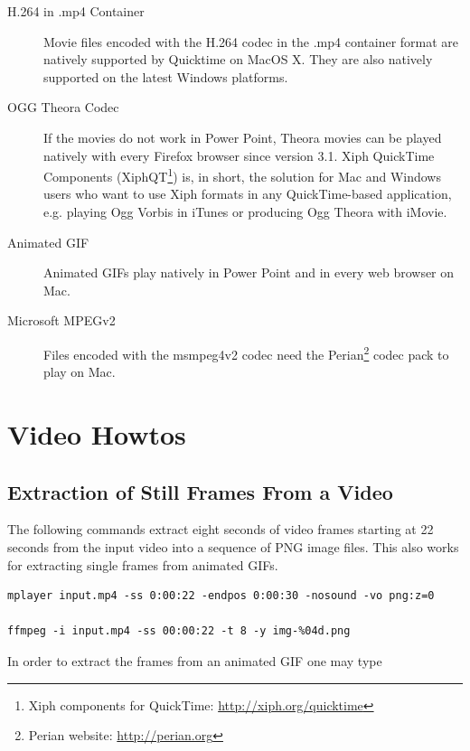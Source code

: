 \begin{description}
\item[H.264 in .mp4 Container] Movie files encoded with the H.264 codec in the
.mp4 container format are natively supported by Quicktime on MacOS X. They are
also natively supported on the latest Windows platforms.

\item[OGG  Theora Codec]  If the  movies do  not work  in Power  Point, Theora
movies  can  be played  natively  with  every  Firefox browser  since  version
3.1. Xiph QuickTime Components (XiphQT\footnote{Xiph components for QuickTime:
\url{http://xiph.org/quicktime}})  is,  in short,  the  solution  for Mac  and
Windows users who want to use Xiph formats in any QuickTime-based application,
e.g.  playing Ogg Vorbis in iTunes or producing Ogg Theora with iMovie.

\item[Animated GIF]  Animated GIFs play natively  in Power Point  and in every
web browser on Mac.

\item[Microsoft  MPEGv2]  Files encoded  with  the  msmpeg4v2  codec need  the
Perian\footnote{Perian website: \url{http://perian.org}} codec pack to play on
Mac.

\end{description}

\section{Video Howtos}

\subsection{Extraction of Still Frames From a Video}

The following  commands extract eight seconds  of video frames  starting at 22
seconds from  the input video into a  sequence of PNG image  files.  This also
works for extracting single frames from animated GIFs.

\begin{verbatim}
mplayer input.mp4 -ss 0:00:22 -endpos 0:00:30 -nosound -vo png:z=0

ffmpeg -i input.mp4 -ss 00:00:22 -t 8 -y img-%04d.png
\end{verbatim}%
%
In order to extract the frames from an animated GIF one may type

